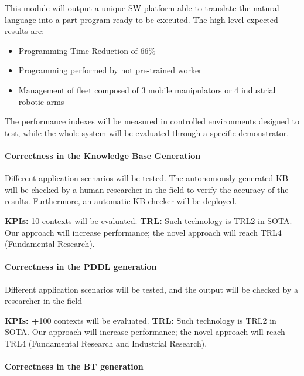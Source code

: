 This module will output a unique SW platform able to translate the
natural language into a part program ready to be executed. The
high-level expected results are:

\begin{itemize}
\item
  Programming Time Reduction of 66\%
\item
  Programming performed by not pre-trained worker
\item
  Management of fleet composed of 3 mobile manipulators or 4 industrial
  robotic arms
\end{itemize}

The performance indexes will be measured in controlled environments
designed to test, while the whole system will be evaluated through a
specific demonstrator.

\paragraph{Correctness in the Knowledge Base
Generation}\label{correctness-in-the-knowledge-base-generation}

Different application scenarios will be tested. The autonomously
generated KB will be checked by a human researcher in the field to
verify the accuracy of the results. Furthermore, an automatic KB checker
will be deployed.

\textbf{KPIs:} 10 contexts will be evaluated. \textbf{\textbar{} TRL:}
Such technology is TRL2 in SOTA. Our approach will increase performance;
the novel approach will reach TRL4 (Fundamental Research).

\paragraph{Correctness in the PDDL
generation}\label{correctness-in-the-pddl-generation}

Different application scenarios will be tested, and the output will be
checked by a researcher in the field

\textbf{KPIs: +}100 contexts will be evaluated. \textbf{\textbar{} TRL:}
Such technology is TRL2 in SOTA. Our approach will increase performance;
the novel approach will reach TRL4 (Fundamental Research and Industrial
Research).

\paragraph{Correctness in the BT
generation}\label{correctness-in-the-bt-generation}

